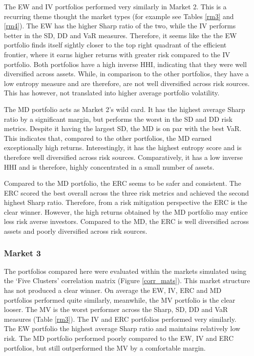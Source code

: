 \documentclass[11pt,preprint, authoryear]{elsarticle}
\numberwithin{equation}{section}
\numberwithin{figure}{section}
\numberwithin{table}{section}
\begin{document}
The EW and IV portfolios performed very similarly in Market 2. This is a
recurring theme thought the market types (for example see Tables
\ref{rm3} and \ref{rm4}). The EW has the higher Sharp ratio of the two,
while the IV performs better in the SD, DD and VaR measures. Therefore,
it seems like the the EW portfolio finds itself sightly closer to the
top right quadrant of the efficient frontier, where it earns higher
returns with greater risk compared to the IV portfolio. Both portfolios
have a high inverse HHI, indicating that they were well diversified
across assets. While, in comparison to the other portfolios, they have a
low entropy measure and are therefore, are not well diversified across
risk sources. This has however, not translated into higher average
portfolio volatility.

The MD portfolio acts as Market 2's wild card. It has the highest
average Sharp ratio by a significant margin, but performs the worst in
the SD and DD risk metrics. Despite it having the largest SD, the MD is
on par with the best VaR. This indicates that, compared to the other
portfolios, the MD earned exceptionally high returns. Interestingly, it
has the highest entropy score and is therefore well diversified across
risk sources. Comparatively, it has a low inverse HHI and is therefore,
highly concentrated in a small number of assets.

Compared to the MD portfolio, the ERC seems to be safer and consistent.
The ERC scored the best overall across the three risk metrics and
achieved the second highest Sharp ratio. Therefore, from a risk
mitigation perspective the ERC is the clear winner. However, the high
returns obtained by the MD portfolio may entice less risk averse
investors. Compared to the MD, the ERC is well diversified across assets
and poorly diversified across risk sources.

\hypertarget{market-3}{%
\subsubsection{Market 3}\label{market-3}}

The portfolios compared here were evaluated within the markets simulated
using the `Five Clusters' correlation matrix (Figure \ref{corr_mats}).
This market structure has not produced a clear winner. On average the
EW, IV, ERC and MD portfolios performed quite similarly, meanwhile, the
MV portfolio is the clear looser. The MV is the worst performer across
the Sharp, SD, DD and VaR measures (Table \ref{rm3}). The IV and ERC
portfolios performed very similarly. The EW portfolio the highest
average Sharp ratio and maintains relatively low risk. The MD portfolio
performed poorly compared to the EW, IV and ERC portfolios, but still
outperformed the MV by a comfortable margin.
\end{document}
